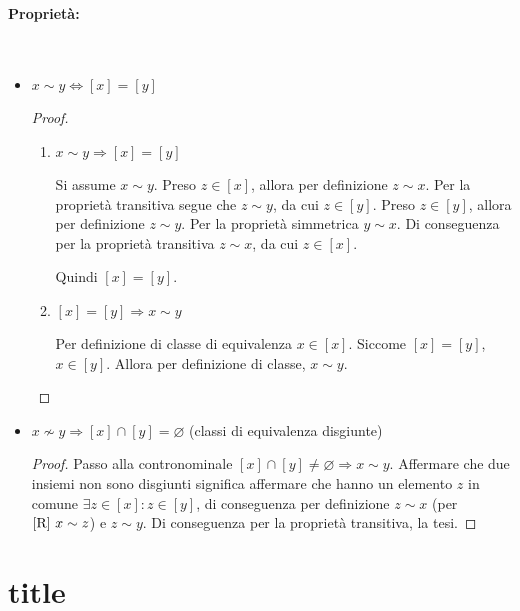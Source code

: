 \documentclass{article}     %
\begin{document}
\paragraph{Proprietà:}~
\begin{itemize}
    \item $x\sim y \Leftrightarrow [x]=[y]$
        \begin{proof}~
            \begin{enumerate}
                \item $x\sim y \Rightarrow [x]=[y]$
            
                Si assume $x\sim y$. 
                Preso $z\in [x]$, allora per definizione $z\sim x$. Per la proprietà transitiva segue che $z\sim y$, da cui $z\in [y]$.
                Preso $z\in [y]$, allora per definizione $z\sim y$. Per la proprietà simmetrica $y\sim x$. Di conseguenza per la proprietà transitiva $z\sim x$, da cui $z\in [x]$.
                
                Quindi $[x]=[y]$.
                \item $[x]=[y] \Rightarrow x\sim y$ 
            
                Per definizione di classe di equivalenza $x \in [x]$. Siccome $[x]=[y]$, $x\in [y]$. Allora per definizione di classe, $x\sim y$.
            \end{enumerate}
        \end{proof}
    \item $x\nsim y \Rightarrow [x]\cap[y]=\varnothing$ (classi di equivalenza disgiunte)
    \begin{proof}
        Passo alla contronominale $[x]\cap [y]\neq\varnothing\Rightarrow x\sim y$. Affermare che due insiemi non sono disgiunti significa affermare che hanno un elemento $z$ in comune $\exists z \in [x]: z\in [y]$, di conseguenza per definizione $z\sim x$  (per $[\textnormal{R}] ~x\sim z$)  e $z\sim y$.  Di conseguenza per la proprietà transitiva, la tesi.
    \end{proof}
    
\end{itemize}

\section{title}
\end{document}
